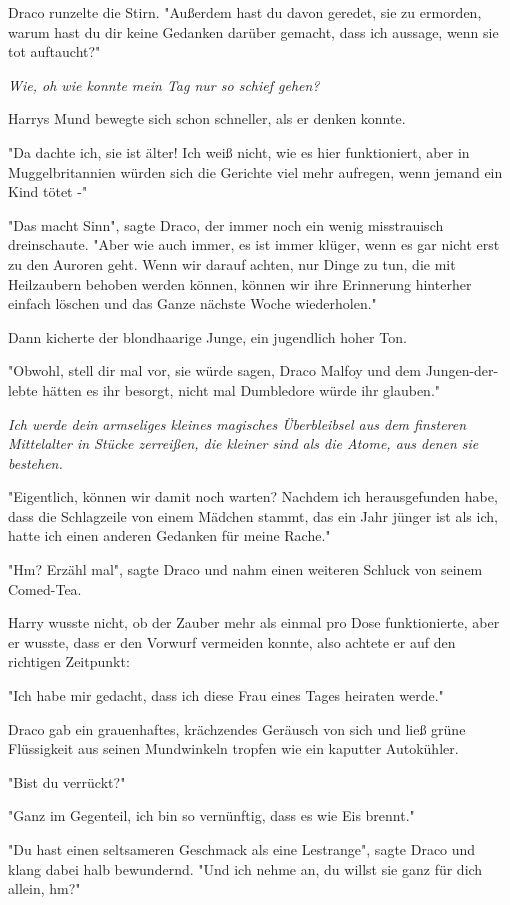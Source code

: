 {Draco runzelte die Stirn. "Außerdem hast du davon geredet, sie zu ermorden, warum hast du dir keine Gedanken darüber gemacht, dass ich aussage, wenn sie tot auftaucht?"

\emph{Wie, oh wie konnte mein Tag nur so schief gehen?}

Harrys Mund bewegte sich schon schneller, als er denken konnte.

"Da dachte ich, sie ist älter! Ich weiß nicht, wie es hier funktioniert, aber in Muggelbritannien würden sich die Gerichte viel mehr aufregen, wenn jemand ein Kind tötet -"

"Das macht Sinn", sagte Draco, der immer noch ein wenig misstrauisch dreinschaute. "Aber wie auch immer, es ist immer klüger, wenn es gar nicht erst zu den Auroren geht. Wenn wir darauf achten, nur Dinge zu tun, die mit Heilzaubern behoben werden können, können wir ihre Erinnerung hinterher einfach löschen und das Ganze nächste Woche wiederholen."

Dann kicherte der blondhaarige Junge, ein jugendlich hoher Ton.

"Obwohl, stell dir mal vor, sie würde sagen, Draco Malfoy und dem Jungen-der-lebte hätten es ihr besorgt, nicht mal Dumbledore würde ihr glauben."

\emph{Ich werde dein armseliges kleines magisches Überbleibsel aus dem finsteren Mittelalter in Stücke zerreißen, die kleiner sind als die Atome, aus denen sie bestehen.}

"Eigentlich, können wir damit noch warten? Nachdem ich herausgefunden habe, dass die Schlagzeile von einem Mädchen stammt, das ein Jahr jünger ist als ich, hatte ich einen anderen Gedanken für meine Rache."

"Hm? Erzähl mal", sagte Draco und nahm einen weiteren Schluck von seinem Comed-Tea.

Harry wusste nicht, ob der Zauber mehr als einmal pro Dose funktionierte, aber er wusste, dass er den Vorwurf vermeiden konnte, also achtete er auf den richtigen Zeitpunkt:

"Ich habe mir gedacht, dass ich diese Frau eines Tages heiraten werde."

Draco gab ein grauenhaftes, krächzendes Geräusch von sich und ließ grüne Flüssigkeit aus seinen Mundwinkeln tropfen wie ein kaputter Autokühler.

"Bist du verrückt?"

"Ganz im Gegenteil, ich bin so vernünftig, dass es wie Eis brennt."

"Du hast einen seltsameren Geschmack als eine Lestrange", sagte Draco und klang dabei halb bewundernd. "Und ich nehme an, du willst sie ganz für dich allein, hm?"

}
